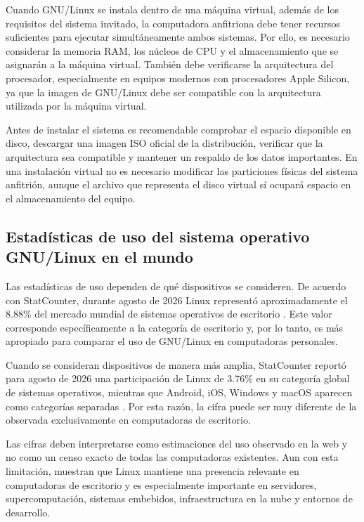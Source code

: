 Cuando GNU/Linux se instala dentro de una máquina virtual, además de los requisitos del sistema invitado, la computadora anfitriona debe tener recursos suficientes para ejecutar simultáneamente ambos sistemas. Por ello, es necesario considerar la memoria RAM, los núcleos de CPU y el almacenamiento que se asignarán a la máquina virtual. También debe verificarse la arquitectura del procesador, especialmente en equipos modernos con procesadores Apple Silicon, ya que la imagen de GNU/Linux debe ser compatible con la arquitectura utilizada por la máquina virtual.

Antes de instalar el sistema es recomendable comprobar el espacio disponible en disco, descargar una imagen ISO oficial de la distribución, verificar que la arquitectura sea compatible y mantener un respaldo de los datos importantes. En una instalación virtual no es necesario modificar las particiones físicas del sistema anfitrión, aunque el archivo que representa el disco virtual sí ocupará espacio en el almacenamiento del equipo.

\subsection{Estadísticas de uso del sistema operativo GNU/Linux en el mundo}
Las estadísticas de uso dependen de qué dispositivos se consideren. De acuerdo con StatCounter, durante agosto de 2026 Linux representó aproximadamente el 8.88\% del mercado mundial de sistemas operativos de escritorio \cite{statcounterdesktop}. Este valor corresponde específicamente a la categoría de escritorio y, por lo tanto, es más apropiado para comparar el uso de GNU/Linux en computadoras personales.

Cuando se consideran dispositivos de manera más amplia, StatCounter reportó para agosto de 2026 una participación de Linux de 3.76\% en su categoría global de sistemas operativos, mientras que Android, iOS, Windows y macOS aparecen como categorías separadas \cite{statcounterworld}. Por esta razón, la cifra puede ser muy diferente de la observada exclusivamente en computadoras de escritorio.

Las cifras deben interpretarse como estimaciones del uso observado en la web y no como un censo exacto de todas las computadoras existentes. Aun con esta limitación, muestran que Linux mantiene una presencia relevante en computadoras de escritorio y es especialmente importante en servidores, supercomputación, sistemas embebidos, infraestructura en la nube y entornos de desarrollo.

